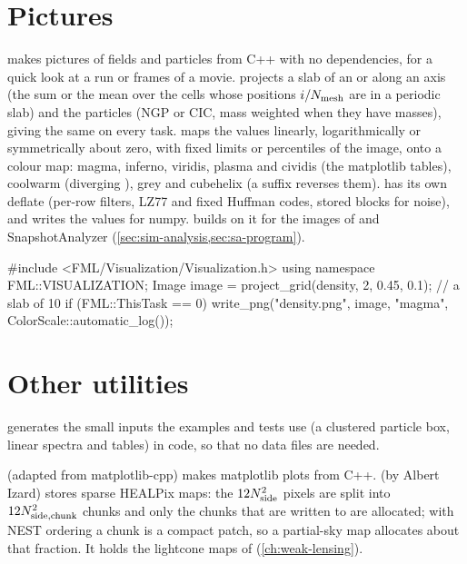 \section{Pictures}\label{sec:io-visualization}

 makes pictures of fields and particles from C++ with no dependencies, for a quick look at a run or
frames of a movie.  projects a slab of an  or  along an axis (the sum or
the mean over the cells whose positions $i/N_{\rm mesh}$ are in a periodic slab) and  the particles
(NGP or CIC, mass weighted when they have masses), giving the same  on every task.  maps the
values linearly, logarithmically or symmetrically about zero, with fixed limits or percentiles of the image, onto a colour
map: magma, inferno, viridis, plasma and cividis (the matplotlib tables), coolwarm (diverging \cite{Moreland2009}), grey
and cubehelix \cite{Green2011} (a suffix  reverses them).  has its own deflate (per-row filters,
LZ77 and fixed Huffman codes, stored blocks for noise), and  writes the values for numpy.
 builds on it for the images of  and SnapshotAnalyzer
(\cref{sec:sim-analysis,sec:sa-program}).

\begin{cppcode}
#include <FML/Visualization/Visualization.h>
using namespace FML::VISUALIZATION;
Image image = project_grid(density, 2, 0.45, 0.1);   // a slab of 10%
if (FML::ThisTask == 0)
    write_png("density.png", image, "magma", ColorScale::automatic_log());
\end{cppcode}

\section{Other utilities}\label{sec:io-other}

 generates the small inputs the examples and tests use (a clustered particle box, linear spectra and
tables) in code, so that no data files are needed.

 (adapted from matplotlib-cpp) makes matplotlib plots from C++.  (by Albert Izard) stores sparse HEALPix
\cite{Gorski2005} maps: the $12N_{\rm side}^2$ pixels are split into $12N_{\rm side,chunk}^2$ chunks and only the chunks that are written to are
allocated; with NEST ordering a chunk is a compact patch, so a partial-sky map allocates about that fraction. It holds the lightcone maps of
 (\cref{ch:weak-lensing}).

